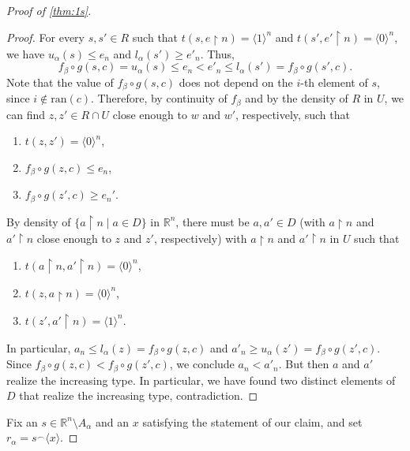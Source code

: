 \documentclass[12pt]{amsart}
\theoremstyle{definition}
\theoremstyle{remark}
\begin{document}
\begin{proof}[Proof of \cref{thm:1s}]
\begin{proof}
For every $s, s' \in R$ such that $t(s, e \upharpoonright n) = \langle 1\rangle^n$ and $t(s',e'  \upharpoonright n) = \langle 0\rangle^n$, we have $u_\alpha(s) \le e_n$ and $l_\alpha(s') \ge e'_n$. Thus,
\[
f_{\beta} \circ g(s, c) = u_\alpha(s) \le e_n < e'_n \le l_\alpha(s') = f_{\beta} \circ g(s', c).
\]
Note that the value of $f_{\beta} \circ g(s, c)$ does not depend on the $i$-th element of $s$, since $i \not \in \mathrm{ran}(c)$. Therefore, by continuity of $f_\beta$ and by the density of $R$ in $U$, we can find $z,z' \in R \cap U$ close enough to $w$ and $w'$, respectively, such that
\begin{enumerate}[label=(\alph*)]
\itemsep0.3em
\item $t(z,z') = \langle 0 \rangle^n$,
\item $f_{\beta} \circ g(z, c) \le e_n$,
\item $f_{\beta} \circ g(z', c) \ge e_n'$.
\end{enumerate}

By density of $\{a \upharpoonright n \mid a \in D\}$ in $\mathbb{R}^n$, there must be $a,a' \in D$ (with $a \upharpoonright n$ and $a' \upharpoonright n$ close enough to $z$ and $z'$, respectively)  with $a\upharpoonright n$ and $a' \upharpoonright n$ in $U$ such that 
\begin{enumerate}[label=(\roman*)]
\itemsep0.3em
\item $t(a \upharpoonright n,a' \upharpoonright n) = \langle 0 \rangle^n$,
\item $t(z, a \upharpoonright n) = \langle 0\rangle^n$,
\item $t(z',a' \upharpoonright n) = \langle 1\rangle^n$.
\end{enumerate}
In particular, $a_n \le l_\alpha(z) = f_{\beta} \circ g(z, c)$ and  $a'_n \ge u_\alpha(z') = f_{\beta} \circ g(z', c)$. Since $f_{\beta} \circ g(z, c) < f_{\beta} \circ g(z', c)$, we conclude $a_n < a'_n$. But then $a$ and $a'$ realize the increasing type. In particular, we have found two distinct elements of $D$ that realize the increasing type, contradiction.
\end{proof}
Fix an $s \in \mathbb{R}^n \setminus A_\alpha$ and an $x$ satisfying the statement of our claim, and set $r_\alpha = s^\smallfrown \langle x\rangle$.

\end{proof}
\end{document}

